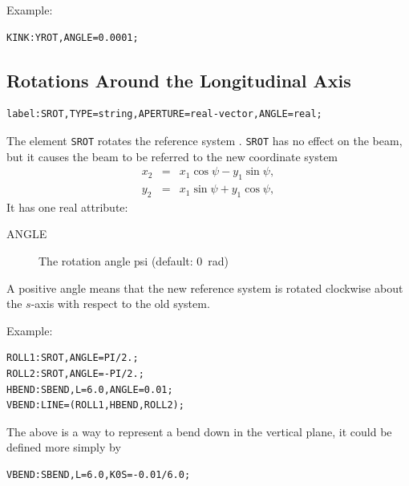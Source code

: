 \noindent Example:
\begin{verbatim}
KINK:YROT,ANGLE=0.0001;
\end{verbatim}

\subsection{Rotations Around the Longitudinal Axis}
\label{sec:srot}
\begin{verbatim}
label:SROT,TYPE=string,APERTURE=real-vector,ANGLE=real;
\end{verbatim}
The element \texttt{SROT} rotates the reference system
.
\texttt{SROT} has no effect on the beam,
but it causes the beam to be referred to the new coordinate system
\[\begin{array}{lcl}
  x_2&=&x_1\cos\psi-y_1\sin\psi, \\
  y_2&=&x_1\sin\psi+y_1\cos\psi,
\end{array}\]
It has one real attribute:
\begin{description}
\item[ANGLE]
  The rotation angle psi (default: 0~rad)
\end{description}
A positive angle means that the new reference system is rotated clockwise
about the $s$-axis with respect to the old system.

\noindent Example:
\begin{verbatim}
ROLL1:SROT,ANGLE=PI/2.;
ROLL2:SROT,ANGLE=-PI/2.;
HBEND:SBEND,L=6.0,ANGLE=0.01;
VBEND:LINE=(ROLL1,HBEND,ROLL2);
\end{verbatim}
The above is a way to represent a bend down in the vertical plane,
it could be defined more simply by
\begin{verbatim}
VBEND:SBEND,L=6.0,K0S=-0.01/6.0;
\end{verbatim}

